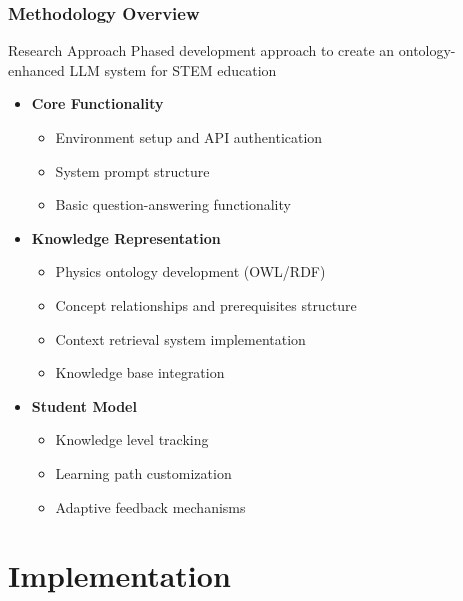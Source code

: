 \documentclass{beamer}
\begin{document}
\begin{frame}
\frametitle{Methodology Overview}

\begin{block}{Research Approach}
Phased development approach to create an ontology-enhanced LLM system for STEM education
\end{block}

\begin{itemize}
    \item \textbf{Core Functionality}
    \begin{itemize}
        \item Environment setup and API authentication
        \item System prompt structure
        \item Basic question-answering functionality
    \end{itemize}
    
    \item \textbf{Knowledge Representation}
    \begin{itemize}
        \item Physics ontology development (OWL/RDF)
        \item Concept relationships and prerequisites structure
        \item Context retrieval system implementation
        \item Knowledge base integration
    \end{itemize}
    
    \item \textbf{Student Model}
    \begin{itemize}
        \item Knowledge level tracking
        \item Learning path customization
        \item Adaptive feedback mechanisms
    \end{itemize}
\end{itemize}
\end{frame}

\section{Implementation}
\end{document}
